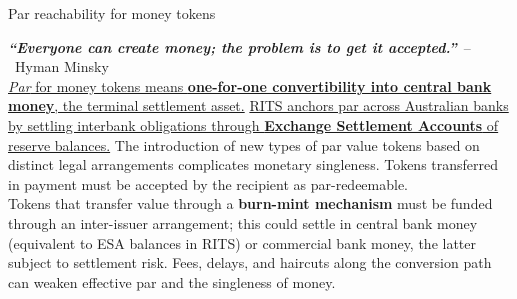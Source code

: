 \documentclass[aspectratio=169,12pt]{beamer}
\begin{document}
\begingroup
\begin{frame}{Par reachability for money tokens\\[-7pt]{\sffamily\mdseries\fontsize{7.2}{8.6}\selectfont\color{black}\parbox[t]{14.76cm}{\raggedright{\itshape\bfseries\color{Or2}\fontsize{8.4}{9.8}\selectfont\textquotedblleft Everyone can create money; the problem is to get it accepted.\textquotedblright}\ {\color{Rust}--~Hyman Minsky}\\[2.5pt]\href{https://www.bis.org/publ/bisbull73.pdf}{\textit{Par} for money tokens means \textbf{one-for-one convertibility into central bank money}, the terminal settlement asset.} \href{https://www.rba.gov.au/payments-and-infrastructure/rits/about.html}{RITS anchors par across Australian banks by settling interbank obligations through \textbf{Exchange Settlement Accounts} of reserve balances.} The introduction of new types of par value tokens based on distinct legal arrangements complicates monetary singleness. Tokens transferred in payment must be accepted by the recipient as par-redeemable.\\[3pt]Tokens that transfer value through a \textbf{burn-mint mechanism} must be funded through an inter-issuer arrangement; this could settle in central bank money (equivalent to ESA balances in RITS) or commercial bank money, the latter subject to settlement risk. Fees, delays, and haircuts along the conversion path can weaken effective par and the singleness of money.}}}

\vspace{-0.6em}\vspace{0.26cm}\begin{center}{  

}
\end{center}
\end{frame}
\end{document}
